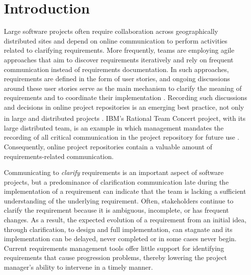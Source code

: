 \section{Introduction}

Large software projects often require collaboration across geographically distributed sites and depend on online communication to perform activities related to clarifying requirements. 
More frequently, teams are employing agile approaches that aim to discover requirements iteratively and rely on frequent communication instead of requirements documentation. 
In such approaches, requirements are defined in the form of user stories, and ongoing discussions around these user stories serve as the main mechanism to clarify the meaning of requirements and to coordinate their implementation \cite{Cao2008}. 
Recording such discussions and decisions in online project repositories is an emerging best practice, not only in large and distributed projects \cite{Aranda2007}.
IBM\textsuperscript{\textregistered}'s Rational Team Concert\textsuperscript{\textregistered} project, with its large distributed team, is an example in which management mandates the recording of all critical communication in the project repository for future use \cite{Frost2007}. 
Consequently, online project repositories contain a valuable amount of requirements-related communication.

Communicating to \emph{clarify} requirements is an important aspect of software projects, but a predominance of clarification communication late during the implementation of a requirement can indicate that the team is lacking a sufficient understanding of the underlying requirement. 
Often, stakeholders continue to clarify the requirement because it is ambiguous, incomplete, or has frequent changes.
As a result, the expected evolution of a requirement from an initial idea, through clarification, to design and full implementation, can stagnate and its implementation can be delayed, never completed or in some cases never begin. 
Current requirements management tools offer little support for identifying requirements that cause progression problems, thereby lowering the project manager's  ability to intervene in a timely manner.

